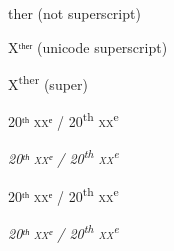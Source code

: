 \documentclass[12pt]{article}
\begin{document}
{\LARGE ther} (not superscript)

{\HUGE Xᵗʰᵉʳ} (unicode superscript)

{\HUGE X\textsuperscript{ther}} (super)

20ᵗʰ \textsc{xx}ᵉ /
20\textsuperscript{th} \textsc{xx}\textsuperscript{e}

\textit{%
20ᵗʰ \textsc{xx}ᵉ /
20\textsuperscript{th} \textsc{xx}\textsuperscript{e}
}

\textsf{%
20ᵗʰ \textsc{xx}ᵉ /
20\textsuperscript{th} \textsc{xx}\textsuperscript{e}
}

\textsf{\textit{%
20ᵗʰ \textsc{xx}ᵉ /
20\textsuperscript{th} \textsc{xx}\textsuperscript{e}
}}
\end{document}
